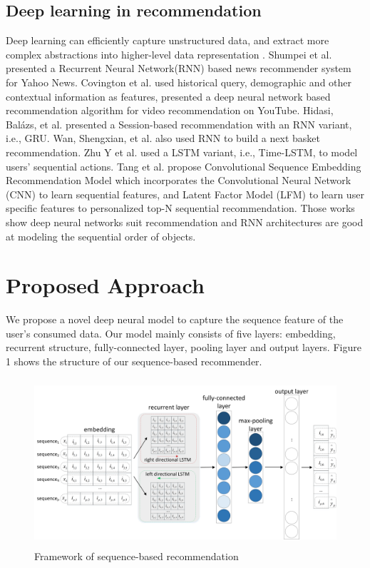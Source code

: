 \documentclass[runningheads]{llncs}
\begin{document}
\subsection{Deep learning in recommendation}
Deep learning can efficiently capture unstructured data, and extract more complex abstractions into higher-level data representation \cite{Zhang2017DeepLB}.  Shumpei et al. \cite{okura2017embedding} presented a Recurrent Neural Network(RNN) based news recommender system for Yahoo News. Covington et al. \cite{covington2016deep} used historical query, demographic and other contextual information as features, presented a deep neural network based recommendation algorithm for video recommendation on YouTube. Hidasi, Balázs, et al. \cite{Hidasi2015Session} presented a Session-based recommendation with an RNN variant, i.e., GRU. Wan, Shengxian, et al. \cite{Wan2015NextBR} also used RNN to build a next basket recommendation. Zhu Y et al. \cite{ijcai2017-504} used a LSTM variant, i.e., Time-LSTM, to model users’ sequential actions. Tang et al. \cite{Tang:2018:PTS:3159652.3159656} propose Convolutional Sequence Embedding Recommendation Model which incorporates the Convolutional Neural Network (CNN) to learn sequential features, and Latent Factor Model (LFM) to learn user specific features to personalized top-N sequential recommendation. Those works show deep neural networks suit recommendation and RNN architectures are good at modeling the sequential order of objects.

\section{Proposed Approach}

We propose a novel deep neural model to capture the sequence feature of the user's consumed data. Our model mainly consists of five layers: embedding, recurrent structure, fully-connected layer, pooling layer and output layers. Figure 1 shows the structure of our sequence-based recommender.
\begin{figure}[htbp]
\centerline
{\includegraphics[height=6.2cm,width=\linewidth]{image/structer.png}}
\caption{Framework of sequence-based recommendation }
\end{figure}
\end{document}
